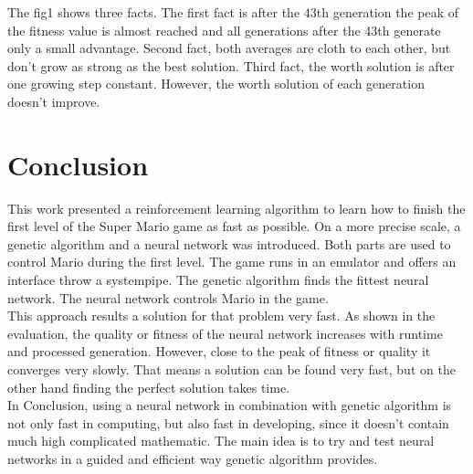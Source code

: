 \documentclass[a4paper]{article}
\begin{document}
The fig1 shows three facts. The first fact is after the 43th generation the peak of the fitness value is almost reached and all generations after the 43th generate only a small advantage. Second fact, both averages are cloth to each other, but don’t grow as strong as the best solution. Third fact, the worth solution is after one growing step constant. However, the worth solution of each generation doesn’t improve.

\section{Conclusion}
This work presented a reinforcement learning algorithm to learn how to finish the first level of the Super Mario game as fast as possible. On a more precise scale, a genetic algorithm and a neural network was introduced. Both parts are used to control Mario during the first level. The game runs in an emulator and offers an interface throw a systempipe. The genetic algorithm finds the fittest neural network. The neural network controls Mario in the game.  \\
This approach results a solution for that problem very fast. As shown in the evaluation, the quality or fitness of the neural network increases with runtime and processed generation. However, close to the peak of fitness or quality it converges very slowly. That means a solution can be found very fast, but on the other hand finding the perfect solution takes time. \\
In Conclusion, using a neural network in combination with genetic algorithm is not only fast in computing, but also fast in developing, since it doesn’t contain much high complicated mathematic. The main idea is to try and test neural networks in a guided and efficient way genetic algorithm provides.





\end{document}
